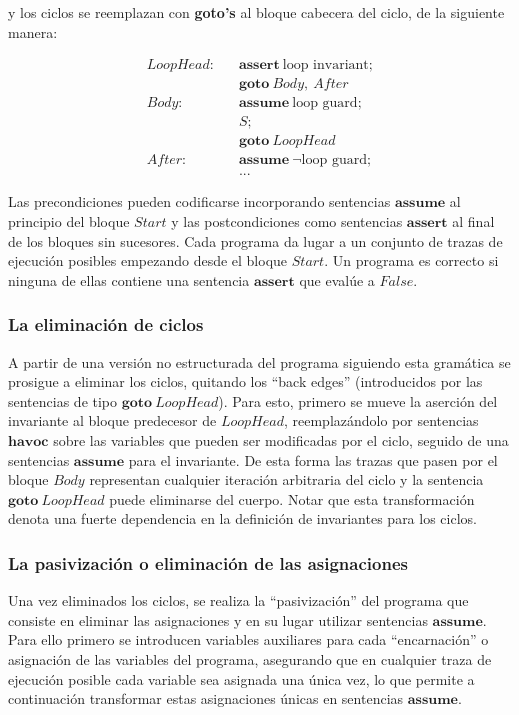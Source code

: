 \documentclass[12pt, a4paper, openany, fleqn]{book}
\begin{document}
    \noindent y los ciclos se reemplazan con \textbf{goto's} al bloque cabecera del ciclo, de la siguiente manera:

    \begin{align*}
        LoopHead:\;\;\;&\textbf{assert}\ \text{loop invariant};\\
                       &\textbf{goto}\ Body,\ After \\
        Body:\;\;\;&\textbf{assume}\ \text{loop guard};\\
                   &S;\\
                   &\textbf{goto}\ LoopHead \\
        After:\;\;\;&\textbf{assume}\ \lnot \text{loop guard};\\
                    & ...
    \end{align*}

    Las precondiciones pueden codificarse incorporando sentencias $\textbf{assume}$ al principio del bloque $Start$ y las postcondiciones como sentencias $\textbf{assert}$ al final de los bloques sin sucesores.
    Cada programa da lugar a un conjunto de trazas de ejecución posibles empezando desde el bloque $Start$. Un programa es correcto si ninguna de ellas contiene una sentencia $\textbf{assert}$ que evalúe a $False$.

    \subsubsection*{La eliminación de ciclos}
    A partir de una versión no estructurada del programa siguiendo esta gramática se prosigue a eliminar los ciclos, quitando los ``back edges'' (introducidos por las sentencias de tipo $\textbf{goto}\ LoopHead$). Para esto, primero se mueve la aserción del invariante al bloque predecesor de $LoopHead$, reemplazándolo por sentencias $\textbf{havoc}$ sobre las variables que pueden ser modificadas por el ciclo, seguido de una sentencias $\textbf{assume}$ para el invariante. De esta forma las trazas que pasen por el bloque $Body$ representan cualquier iteración arbitraria del ciclo y la sentencia $\textbf{goto}\ LoopHead$ puede eliminarse del cuerpo.
    Notar que esta transformación denota una fuerte dependencia en la definición de invariantes para los ciclos.

    \subsubsection*{La pasivización o eliminación de las asignaciones}
    Una vez eliminados los ciclos, se realiza la ``pasivización'' del programa que consiste en eliminar las asignaciones y en su lugar utilizar sentencias $\textbf{assume}$. Para ello primero se introducen variables auxiliares para cada ``encarnación'' o asignación de las variables del programa, asegurando que en cualquier traza de ejecución posible cada variable sea asignada una única vez, lo que permite a continuación transformar estas asignaciones únicas en sentencias $\textbf{assume}$.
\end{document}
